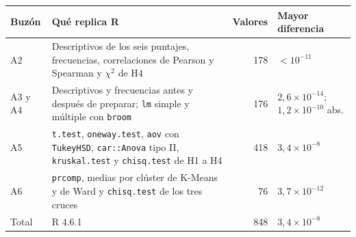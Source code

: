 \begin{tabular}{@{}l>{\raggedright\arraybackslash}p{2.9cm}rl@{}}
\toprule
Buzón & Qué replica R & Valores & Mayor diferencia \\
\midrule
A2 & Descriptivos de los seis puntajes, frecuencias, correlaciones de Pearson y Spearman y $\chi^2$ de H4 & 178 & $<10^{-11}$ \\
A3 y A4 & Descriptivos y frecuencias antes y después de preparar; \texttt{lm} simple y múltiple con \texttt{broom} & 176 & $2{,}6\times10^{-14}$; $1{,}2\times10^{-10}$ abs. \\
A5 & \texttt{t.test}, \texttt{oneway.test}, \texttt{aov} con \texttt{TukeyHSD}, \texttt{car::Anova} tipo II, \texttt{kruskal.test} y \texttt{chisq.test} de H1 a H4 & 418 & $3{,}4\times10^{-8}$ \\
A6 & \texttt{prcomp}, medias por clúster de K-Means y de Ward y \texttt{chisq.test} de los tres cruces & 76 & $3{,}7\times10^{-12}$ \\
\midrule
Total & R 4.6.1 & 848 & $3{,}4\times10^{-8}$ \\
\bottomrule
\end{tabular}
